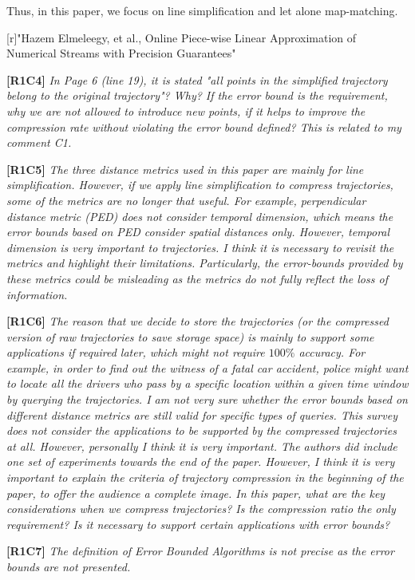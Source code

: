 \documentclass{letter}
\begin{document}
Thus, in this paper, we focus on line simplification and let alone map-matching.

[r]"Hazem Elmeleegy, et al., Online Piece-wise Linear Approximation of Numerical Streams with Precision Guarantees"


\textbf{[R1C4]} \emph{ In Page 6 (line 19), it is stated "all points in the simplified trajectory belong to the original trajectory"? Why? If the error bound is the requirement, why we are not allowed to introduce new points, if it helps to improve the compression rate without violating the error bound defined? This is related to my comment C1. }

\textbf{[R1C5]} \emph{The three distance metrics used in this paper are mainly for line simplification. However, if we apply line simplification to compress trajectories, some of the metrics are no longer that useful. For example, perpendicular distance metric (PED) does not consider temporal dimension, which means the error bounds based on PED consider spatial distances only. However, temporal dimension is very important to trajectories. I think it is necessary to revisit the metrics and highlight their limitations. Particularly, the error-bounds provided by these metrics could be misleading as the metrics do not fully reflect the loss of information. }

\textbf{[R1C6]} \emph{ The reason that we decide to store the trajectories (or the compressed version of raw trajectories to save storage space) is mainly to support some applications if required later, which might not require $100\%$ accuracy. For example, in order to find out the witness of a fatal car accident, police might want to locate all the drivers who pass by a specific location within a given time window by querying the trajectories. I am not very sure whether the error bounds based on different distance metrics are still valid for specific types of queries. This survey does not consider the applications to be supported by the compressed trajectories at all. However, personally I think it is very important. The authors did include one set of experiments towards the end of the paper. However, I think it is very important to explain the criteria of trajectory compression in the beginning of the paper, to offer the audience a complete image. In this paper, what are the key considerations when we compress trajectories? Is the compression ratio the only requirement? Is it necessary to support certain applications with error bounds? }

\textbf{[R1C7]} \emph{ The definition of Error Bounded Algorithms is not precise as the error bounds are not presented. }
\end{document}

